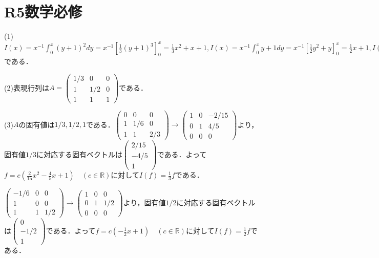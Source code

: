 \documentclass[
		book,
		head_space=20mm,
		foot_space=20mm,
		gutter=10mm,
		line_length=190mm
]{jlreq}
\begin{document}
\section{R5数学必修}
(1) $I(x)=x^{-1}\int_0^x (y+1)^2dy=x^{-1}\left[\frac{1}{3}(y+1)^3\right]_0^x=\frac{1}{3}x^2+x+1,I(x)=x^{-1}\int_0^x y+1dy=x^{-1}\left[\frac{1}{2}y^2+y\right]_0^x=\frac{1}{2}x+1,I(1)=x^{-1}\int_0^x 1dy=1$である．

(2)表現行列は$A=\begin{pmatrix}
	1/3 & 0 & 0\\
	1 & 1/2 & 0\\
	1 & 1 & 1
\end{pmatrix}$である．

(3)$A$の固有値は$1/3,1/2,1$である．$\begin{pmatrix}
	0 & 0 & 0\\
	1 & 1/6 & 0\\
	1 & 1 & 2/3
	\end{pmatrix}\rightarrow \begin{pmatrix}
	1 & 0 & -2/15\\
	0 & 1 & 4/5\\
	0 & 0 & 0
	\end{pmatrix}$より，固有値$1/3$に対応する固有ベクトルは$\begin{pmatrix}
	2/15\\
	-4/5\\
	1
\end{pmatrix}$である．よって$f=c(\frac{2}{15}x^2-\frac{4}{5}x+1) \quad(c\in \mathbb{R})$に対して$I(f)=\frac{1}{3}f$である．

$\begin{pmatrix}
	-1/6 & 0 & 0\\
	1 & 0 & 0\\
	1 & 1 & 1/2
	\end{pmatrix}\rightarrow \begin{pmatrix}
	1 & 0 & 0\\
	0 & 1 & 1/2\\
	0 & 0 & 0
	\end{pmatrix}$より，固有値$1/2$に対応する固有ベクトルは$\begin{pmatrix}
	0\\
	-1/2\\
	1
\end{pmatrix}$である．よって$f=c(-\frac{1}{2}x+1) \quad(c\in \mathbb{R})$に対して$I(f)=\frac{1}{2}f$である．
\end{document}
